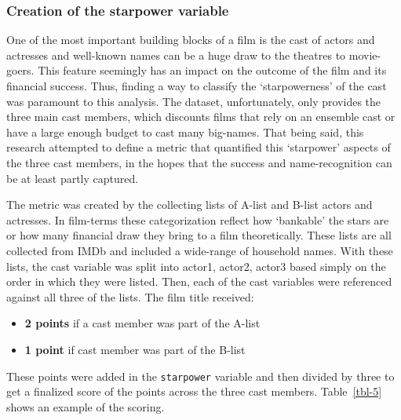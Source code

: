 \documentclass[
]{agujournal2019}
\providecommand{\tightlist}{%
  \setlength{\itemsep}{0pt}\setlength{\parskip}{0pt}}\usepackage{longtable,booktabs,array}
\begin{document}
\subsubsection{Creation of the starpower
variable}\label{creation-of-the-starpower-variable}

One of the most important building blocks of a film is the cast of
actors and actresses and well-known names can be a huge draw to the
theatres to movie-goers. This feature seemingly has an impact on the
outcome of the film and its financial success. Thus, finding a way to
classify the `starpowerness' of the cast was paramount to this analysis.
The dataset, unfortunately, only provides the three main cast members,
which discounts films that rely on an ensemble cast or have a large
enough budget to cast many big-names. That being said, this research
attempted to define a metric that quantified this `starpower' aspects of
the three cast members, in the hopes that the success and
name-recognition can be at least partly captured.

The metric was created by the collecting lists of A-list and B-list
actors and actresses. In film-terms these categorization reflect how
`bankable' the stars are or how many financial draw they bring to a film
theoretically. These lists are all collected from IMDb and included a
wide-range of household names. With these lists, the cast variable was
split into actor1, actor2, actor3 based simply on the order in which
they were listed. Then, each of the cast variables were referenced
against all three of the lists. The film title received:

\begin{itemize}
\tightlist
\item
  \textbf{2 points} if a cast member was part of the A-list\\
\item
  \textbf{1 point} if cast member was part of the B-list
\end{itemize}

These points were added in the \texttt{starpower} variable and then
divided by three to get a finalized score of the points across the three
cast members. Table~\ref{tbl-5} shows an example of the scoring.
\end{document}
